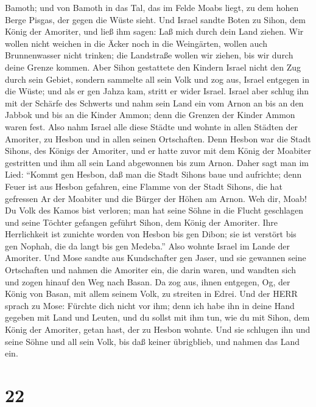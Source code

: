 Bamoth;  und von Bamoth in das Tal, das im Felde Moabs
liegt, zu dem hohen Berge Pisgas, der gegen die Wüste sieht.
 Und Israel sandte Boten zu Sihon, dem König der Amoriter,
und ließ ihm sagen:  Laß mich durch dein Land ziehen. Wir
wollen nicht weichen in die Äcker noch in die Weingärten, wollen auch
Brunnenwasser nicht trinken; die Landstraße wollen wir ziehen, bis wir
durch deine Grenze kommen.  Aber Sihon gestattete den
Kindern Israel nicht den Zug durch sein Gebiet, sondern sammelte all
sein Volk und zog aus, Israel entgegen in die Wüste; und als er gen
Jahza kam, stritt er wider Israel.  Israel aber schlug ihn
mit der Schärfe des Schwerts und nahm sein Land ein vom Arnon an bis an
den Jabbok und bis an die Kinder Ammon; denn die Grenzen der Kinder
Ammon waren fest.  Also nahm Israel alle diese Städte und
wohnte in allen Städten der Amoriter, zu Hesbon und in allen seinen
Ortschaften.  Denn Hesbon war die Stadt Sihons, des Königs
der Amoriter, und er hatte zuvor mit dem König der Moabiter gestritten
und ihm all sein Land abgewonnen bis zum Arnon.  Daher sagt
man im Lied: ``Kommt gen Hesbon, daß man die Stadt Sihons baue und
aufrichte;  denn Feuer ist aus Hesbon gefahren, eine Flamme
von der Stadt Sihons, die hat gefressen Ar der Moabiter und die Bürger
der Höhen am Arnon.  Weh dir, Moab! Du Volk des Kamos bist
verloren; man hat seine Söhne in die Flucht geschlagen und seine Töchter
gefangen geführt Sihon, dem König der Amoriter.  Ihre
Herrlichkeit ist zunichte worden von Hesbon bis gen Dibon; sie ist
verstört bis gen Nophah, die da langt bis gen Medeba.'' 
Also wohnte Israel im Lande der Amoriter.  Und Mose sandte
aus Kundschafter gen Jaser, und sie gewannen seine Ortschaften und
nahmen die Amoriter ein, die darin waren,  und wandten sich
und zogen hinauf den Weg nach Basan. Da zog aus, ihnen entgegen, Og, der
König von Basan, mit allem seinem Volk, zu streiten in Edrei.
 Und der HERR sprach zu Mose: Fürchte dich nicht vor ihm;
denn ich habe ihn in deine Hand gegeben mit Land und Leuten, und du
sollst mit ihm tun, wie du mit Sihon, dem König der Amoriter, getan
hast, der zu Hesbon wohnte.  Und sie schlugen ihn und seine
Söhne und all sein Volk, bis daß keiner übrigblieb, und nahmen das Land
ein.

\hypertarget{section-21}{%
\section{22}\label{section-21}}


